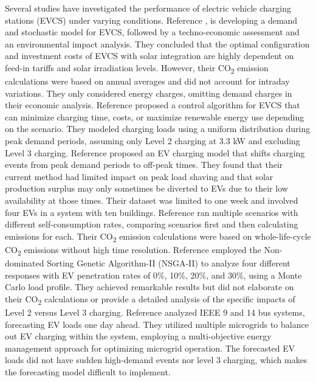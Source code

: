 \documentclass[conference]{IEEEtran}
\begin{document}
  		Several studies have investigated the performance of electric vehicle charging stations (EVCS) under varying conditions. Reference \cite{himabindu2021analysis}, is developing a demand and stochastic model for EVCS, followed by a techno-economic assessment and an environmental impact analysis. They concluded that the optimal configuration and investment costs of EVCS with solar integration are highly dependent on feed-in tariffs and solar irradiation levels. However, their CO\textsubscript{2} emission calculations were based on annual averages and did not account for intraday variations. They only considered energy charges, omitting demand charges in their economic analysis. Reference \cite{yoon2017economic} proposed a control algorithm for EVCS that can minimize charging time, costs, or maximize renewable energy use depending on the scenario. They modeled charging loads using a uniform distribution during peak demand periods, assuming only Level 2 charging at 3.3 kW and excluding Level 3 charging.  Reference \cite{purvins2018electric} proposed an EV charging model that shifts charging events from peak demand periods to off-peak times. They found that their current method had limited impact on peak load shaving and that solar production surplus may only sometimes be diverted to EVs due to their low availability at those times. Their dataset was limited to one week and involved four EVs in a system with ten buildings. Reference \cite{Khemir} ran multiple scenarios with different self-consumption rates, comparing scenarios first and then calculating emissions for each. Their CO\textsubscript{2} emission calculations were based on whole-life-cycle CO\textsubscript{2} emissions without high time resolution. Reference \cite{huang2023multi} employed the Non-dominated Sorting Genetic Algorithm-II (NSGA-II) to analyze four different responses with EV penetration rates of 0\%, 10\%, 20\%, and 30\%, using a Monte Carlo load profile. They achieved remarkable results but did not elaborate on their CO\textsubscript{2} calculations or provide a detailed analysis of the specific impacts of Level 2 versus Level 3 charging. Reference \cite{tan2020multi} analyzed IEEE 9 and 14 bus systems, forecasting EV loads one day ahead. They utilized multiple microgrids to balance out EV charging within the system, employing a multi-objective energy management approach for optimizing microgrid operation. The forecasted EV loads did not have sudden high-demand events nor level 3 charging, which makes the forecasting model difficult to implement. 
\end{document}
